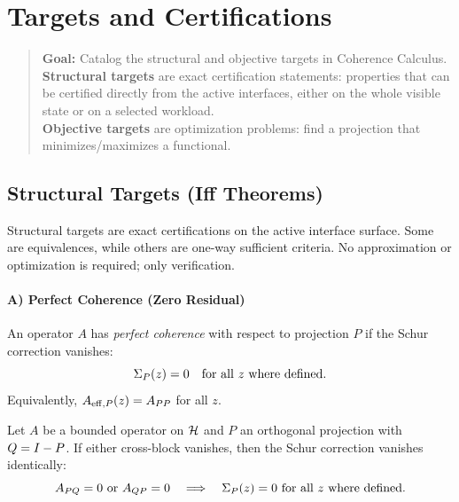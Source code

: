 \section{Targets and Certifications}
\label{sec:targets}

\begin{quote}\small
\textbf{Goal:} Catalog the structural and objective targets in Coherence Calculus.\\
\textbf{Structural targets} are exact certification statements: properties that can be certified directly from the active interfaces, either on the whole visible state or on a selected workload.\\
\textbf{Objective targets} are optimization problems: find a projection that minimizes/maximizes a functional.
\end{quote}

\subsection{Structural Targets (Iff Theorems)}
\label{subsec:structural-targets}

Structural targets are exact certifications on the active interface surface.
Some are equivalences, while others are one-way sufficient criteria.
No approximation or optimization is required; only verification.

\paragraph{A) Perfect Coherence (Zero Residual)}

\begin{definition}
\label{def:perfect-coherence}
An operator $A$ has \emph{perfect coherence} with respect to projection $P$ if the Schur correction vanishes:
\[
\Sigma_{P}(z) = 0 \quad \text{for all $z$ where defined}.
\]
Equivalently, $A_{\mathrm{eff},P}(z) = A_{PP}$ for all $z$.
\end{definition}

\begin{theorem}
\label{thm:block-diagonal-sufficient}
Let $A$ be a bounded operator on $\mathcal{H}$ and $P$ an orthogonal projection with $Q = I - P$.
If either cross-block vanishes, then the Schur correction vanishes identically:
\[
A_{PQ} = 0 \text{ or } A_{QP} = 0
\quad \Longrightarrow \quad
\Sigma_{P}(z) = 0 \text{ for all $z$ where defined}.
\]
\end{theorem}


